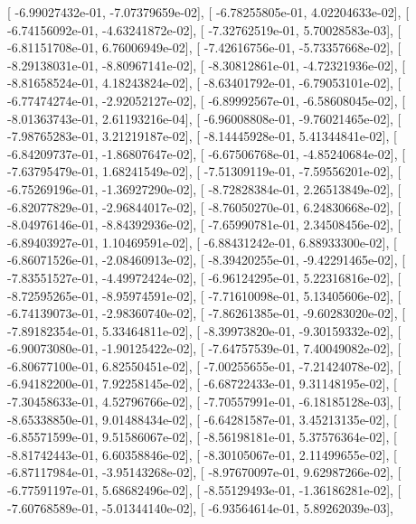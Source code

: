 \documentclass{article}
\begin{document}
       [ -6.99027432e-01,  -7.07379659e-02],
       [ -6.78255805e-01,   4.02204633e-02],
       [ -6.74156092e-01,  -4.63241872e-02],
       [ -7.32762519e-01,   5.70028583e-03],
       [ -6.81151708e-01,   6.76006949e-02],
       [ -7.42616756e-01,  -5.73357668e-02],
       [ -8.29138031e-01,  -8.80967141e-02],
       [ -8.30812861e-01,  -4.72321936e-02],
       [ -8.81658524e-01,   4.18243824e-02],
       [ -8.63401792e-01,  -6.79053101e-02],
       [ -6.77474274e-01,  -2.92052127e-02],
       [ -6.89992567e-01,  -6.58608045e-02],
       [ -8.01363743e-01,   2.61193216e-04],
       [ -6.96008808e-01,  -9.76021465e-02],
       [ -7.98765283e-01,   3.21219187e-02],
       [ -8.14445928e-01,   5.41344841e-02],
       [ -6.84209737e-01,  -1.86807647e-02],
       [ -6.67506768e-01,  -4.85240684e-02],
       [ -7.63795479e-01,   1.68241549e-02],
       [ -7.51309119e-01,  -7.59556201e-02],
       [ -6.75269196e-01,  -1.36927290e-02],
       [ -8.72828384e-01,   2.26513849e-02],
       [ -6.82077829e-01,  -2.96844017e-02],
       [ -8.76050270e-01,   6.24830668e-02],
       [ -8.04976146e-01,  -8.84392936e-02],
       [ -7.65990781e-01,   2.34508456e-02],
       [ -6.89403927e-01,   1.10469591e-02],
       [ -6.88431242e-01,   6.88933300e-02],
       [ -6.86071526e-01,  -2.08460913e-02],
       [ -8.39420255e-01,  -9.42291465e-02],
       [ -7.83551527e-01,  -4.49972424e-02],
       [ -6.96124295e-01,   5.22316816e-02],
       [ -8.72595265e-01,  -8.95974591e-02],
       [ -7.71610098e-01,   5.13405606e-02],
       [ -6.74139073e-01,  -2.98360740e-02],
       [ -7.86261385e-01,  -9.60283020e-02],
       [ -7.89182354e-01,   5.33464811e-02],
       [ -8.39973820e-01,  -9.30159332e-02],
       [ -6.90073080e-01,  -1.90125422e-02],
       [ -7.64757539e-01,   7.40049082e-02],
       [ -6.80677100e-01,   6.82550451e-02],
       [ -7.00255655e-01,  -7.21424078e-02],
       [ -6.94182200e-01,   7.92258145e-02],
       [ -6.68722433e-01,   9.31148195e-02],
       [ -7.30458633e-01,   4.52796766e-02],
       [ -7.70557991e-01,  -6.18185128e-03],
       [ -8.65338850e-01,   9.01488434e-02],
       [ -6.64281587e-01,   3.45213135e-02],
       [ -6.85571599e-01,   9.51586067e-02],
       [ -8.56198181e-01,   5.37576364e-02],
       [ -8.81742443e-01,   6.60358846e-02],
       [ -8.30105067e-01,   2.11499655e-02],
       [ -6.87117984e-01,  -3.95143268e-02],
       [ -8.97670097e-01,   9.62987266e-02],
       [ -6.77591197e-01,   5.68682496e-02],
       [ -8.55129493e-01,  -1.36186281e-02],
       [ -7.60768589e-01,  -5.01344140e-02],
       [ -6.93564614e-01,   5.89262039e-03],
\end{document}
